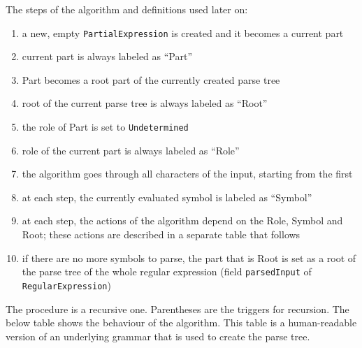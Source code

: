 \documentclass{article}
\begin{document}
The steps of the algorithm and definitions used later on:
\begin{enumerate}

  \item a new, empty \verb|PartialExpression| is created and it becomes a current part

  \item current part is always labeled as ``Part''

  \item Part becomes a root part of the currently created parse tree

  \item root of the current parse tree is always labeled as ``Root''

  \item the role of Part is set to \verb|Undetermined|

  \item role of the current part is always labeled as ``Role''

  \item the algorithm goes through all characters of the input, starting from the first

  \item at each step, the currently evaluated symbol is labeled as ``Symbol''

  \item at each step, the actions of the algorithm depend on the Role, Symbol and Root; these
  actions are described in a separate table that follows

  \item if there are no more symbols to parse, the part that is Root is set as a root of the parse
  tree of the whole regular expression (field \verb|parsedInput| of \verb|RegularExpression|)

\end{enumerate}

The procedure is a recursive one. Parentheses are the triggers for recursion. The below table shows
the behaviour of the algorithm. This table is a human-readable version of an underlying grammar that
is used to create the parse tree.
\end{document}
